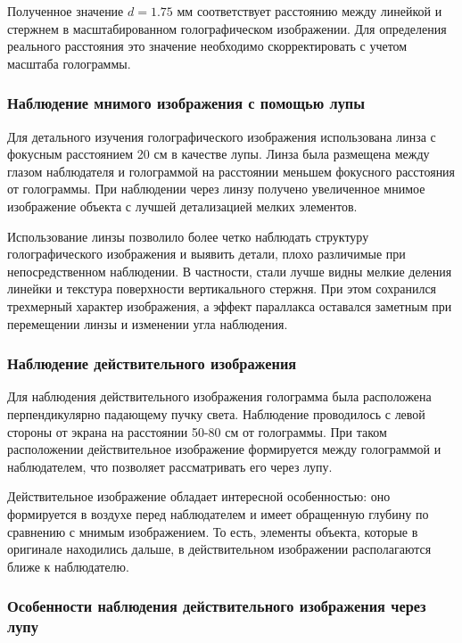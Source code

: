 Полученное значение $d = 1.75$ мм соответствует расстоянию между линейкой и стержнем в масштабированном голографическом изображении. Для определения реального расстояния это значение необходимо скорректировать с учетом масштаба голограммы.

\subsubsection{Наблюдение мнимого изображения с помощью лупы}

Для детального изучения голографического изображения использована линза с фокусным расстоянием 20 см в качестве лупы. Линза была размещена между глазом наблюдателя и голограммой на расстоянии меньшем фокусного расстояния от голограммы. При наблюдении через линзу получено увеличенное мнимое изображение объекта с лучшей детализацией мелких элементов.

Использование линзы позволило более четко наблюдать структуру голографического изображения и выявить детали, плохо различимые при непосредственном наблюдении. В частности, стали лучше видны мелкие деления линейки и текстура поверхности вертикального стержня. При этом сохранился трехмерный характер изображения, а эффект параллакса оставался заметным при перемещении линзы и изменении угла наблюдения.

\subsubsection{Наблюдение действительного изображения}

Для наблюдения действительного изображения голограмма была расположена перпендикулярно падающему пучку света. Наблюдение проводилось с левой стороны от экрана на расстоянии 50-80 см от голограммы. При таком расположении действительное изображение формируется между голограммой и наблюдателем, что позволяет рассматривать его через лупу.

Действительное изображение обладает интересной особенностью: оно формируется в воздухе перед наблюдателем и имеет обращенную глубину по сравнению с мнимым изображением. То есть, элементы объекта, которые в оригинале находились дальше, в действительном изображении располагаются ближе к наблюдателю.

\subsubsection{Особенности наблюдения действительного изображения через лупу}

